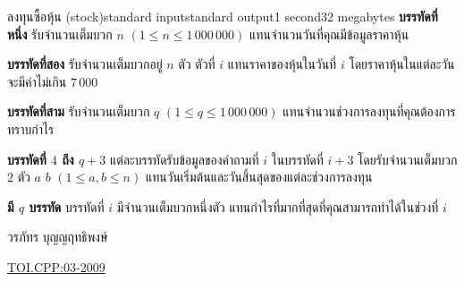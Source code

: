 \documentclass[11pt,a4paper]{article}
\begin{document}
\begin{problem}{ลงทุนซื้อหุ้น (stock)}{standard input}{standard output}{1 second}{32 megabytes}
\textbf{บรรทัดที่หนึ่ง}  รับจำนวนเต็มบวก $n$ $(1 \leq n \leq 1\,000\,000)$ แทนจำนวนวันที่คุณมีข้อมูลราคาหุ้น
  
\textbf{บรรทัดที่สอง} รับจำนวนเต็มบวกอยู่ $n$ ตัว ตัวที่ $i$ แทนราคาของหุ้นในวันที่ $i$ โดยราคาหุ้นในแต่ละวันจะมีค่าไม่เกิน $7\,000$
        
\textbf{บรรทัดที่สาม} รับจำนวนเต็มบวก $q$ $(1 \leq q \leq 1\,000\,000)$ แทนจำนวนช่วงการลงทุนที่คุณต้องการทราบกำไร

\textbf{บรรทัดที่ $4$ ถึง $q+3$} แต่ละบรรทัดรับข้อมูลของคำถามที่ $i$ ในบรรทัดที่ $i+3$ โดยรับจำนวนเต็มบวก $2$ ตัว $a$ $b$ $(1 \leq a, b \leq n)$ แทนวันเริ่มต้นและวันสิ้นสุดของแต่ละช่วงการลงทุน


\OutputFile

\textbf{มี $q$ บรรทัด} บรรทัดที่ $i$ มีจำนวนเต็มบวกหนึ่งตัว แทนกำไรที่มากที่สุดที่คุณสามารถทำได้ในช่วงที่ $i$

\Examples

\begin{example}
%
\end{example}


\Source

วรภัทร บุญญฤทธิพงษ์

\underline{\href{http://www.thailandoi.org/toi.c/03-2009}{TOI.CPP:03-2009}}

\end{problem}
\end{document}
